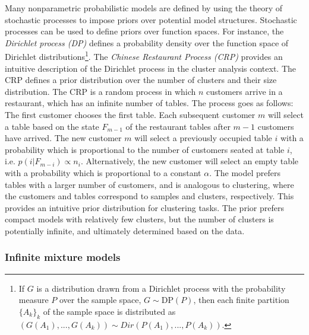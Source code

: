 Many nonparametric probabilistic models are defined by using the
theory of stochastic processes to impose priors over potential model
structures. Stochastic processes can be used to define priors over
function spaces. For instance, the {\it Dirichlet process (DP)}
defines a probability density over the function space of Dirichlet
distributions\footnote{If \(G\) is a distribution drawn from a
  Dirichlet process with the probability measure \(P\) over the sample
  space, \(G \sim \mathrm{DP}(P)\), then each finite partition
  \(\{A_k\}_k\) of the sample space is distributed as
  \((G(A_1),...,G(A_k)) \sim Dir(P(A_1),..., P(A_k))\).}. The {\it
  Chinese Restaurant Process (CRP)} provides an intuitive description
of the Dirichlet process in the cluster analysis context. The CRP
defines a prior distribution over the number of clusters and their
size distribution. The CRP is a random process in which $n$ customers
arrive in a restaurant, which has an infinite number of tables. The
process goes as follows: The first customer chooses the first
table. Each subsequent customer \(m\) will select a table based on the
state \(F_{m-1}\) of the restaurant tables after $m-1$ customers have
arrived. The new customer \(m\) will select a previously occupied
table $i$ with a probability which is proportional to the number of
customers seated at table $i$, i.e. \(p(i|F_{m-i}) \propto
n_i\). Alternatively, the new customer will select an empty table with
a probability which is proportional to a constant \(\alpha\). The
model prefers tables with a larger number of customers, and is
analogous to clustering, where the customers and tables correspond to
samples and clusters, respectively. This provides an intuitive prior
distribution for clustering tasks. The prior prefers compact models
with relatively few clusters, but the number of clusters is
potentially infinite, and ultimately determined based on the data.

\subsubsection{Infinite mixture models}

